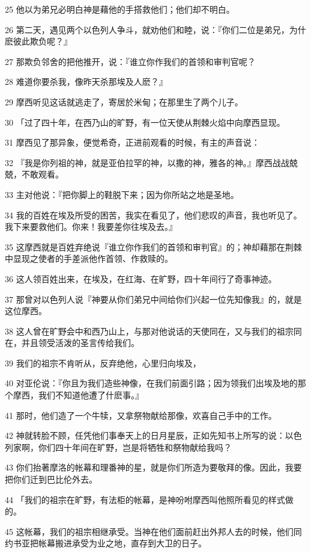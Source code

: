 \par 25 他以为弟兄必明白神是藉他的手搭救他们；他们却不明白。
\par 26 第二天，遇见两个以色列人争斗，就劝他们和睦，说：『你们二位是弟兄，为什麽彼此欺负呢？』
\par 27 那欺负邻舍的把他推开，说：『谁立你作我们的首领和审判官呢？
\par 28 难道你要杀我，像昨天杀那埃及人麽？』
\par 29 摩西听见这话就逃走了，寄居於米甸；在那里生了两个儿子。
\par 30 「过了四十年，在西乃山的旷野，有一位天使从荆棘火焰中向摩西显现。
\par 31 摩西见了那异象，便觉希奇，正进前观看的时候，有主的声音说：
\par 32 『我是你列祖的神，就是亚伯拉罕的神，以撒的神，雅各的神。』摩西战战兢兢，不敢观看。
\par 33 主对他说：『把你脚上的鞋脱下来；因为你所站之地是圣地。
\par 34 我的百姓在埃及所受的困苦，我实在看见了，他们悲叹的声音，我也听见了。我下来要救他们。你来！我要差你往埃及去。』
\par 35 这摩西就是百姓弃绝说『谁立你作我们的首领和审判官』的；神却藉那在荆棘中显现之使者的手差派他作首领、作救赎的。
\par 36 这人领百姓出来，在埃及，在红海、在旷野，四十年间行了奇事神迹。
\par 37 那曾对以色列人说『神要从你们弟兄中间给你们兴起一位先知像我』的，就是这位摩西。
\par 38 这人曾在旷野会中和西乃山上，与那对他说话的天使同在，又与我们的祖宗同在，并且领受活泼的圣言传给我们。
\par 39 我们的祖宗不肯听从，反弃绝他，心里归向埃及，
\par 40 对亚伦说：『你且为我们造些神像，在我们前面引路；因为领我们出埃及地的那个摩西，我们不知道他遭了什麽事。』
\par 41 那时，他们造了一个牛犊，又拿祭物献给那像，欢喜自己手中的工作。
\par 42 神就转脸不顾，任凭他们事奉天上的日月星辰，正如先知书上所写的说：以色列家啊，你们四十年间在旷野，岂是将牺牲和祭物献给我吗？
\par 43 你们抬著摩洛的帐幕和理番神的星，就是你们所造为要敬拜的像。因此，我要把你们迁到巴比伦外去。
\par 44 「我们的祖宗在旷野，有法柜的帐幕，是神吩咐摩西叫他照所看见的样式做的。
\par 45 这帐幕，我们的祖宗相继承受。当神在他们面前赶出外邦人去的时候，他们同约书亚把帐幕搬进承受为业之地，直存到大卫的日子。
